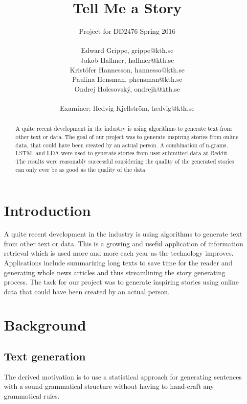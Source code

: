 \documentclass[12pt,a4paper,utf8]{article}
\title{Tell Me a Story}
\author{Project for DD2476 Spring 2016\\\\Edward Grippe, grippe@kth.se\\Jakob Hallmer, hallmer@kth.se\\Kristófer Hannesson, hannesso@kth.se\\Paulina Hensman, phensman@kth.se\\Ondrej Holesovský, ondrejh@kth.se\\\\ Examiner: Hedvig Kjellström, hedvig@kth.se}
\begin{document}
\maketitle
\thispagestyle{empty}
\clearpage


\begin{abstract}
A quite recent development in the industry is using algorithms to generate text from other text or data. The goal of our project was to generate inspiring stories from online data, that could have been created by an actual person. A combination of n-grams, LSTM, and LDA were used to generate stories from user submitted data at Reddit. The results were reasonably successful considering the quality of the generated stories can only ever be as good as the quality of the data.
\end{abstract}
\pagebreak


\pagestyle{plain}
\tableofcontents
\cleardoublepage
\pagebreak




\setcounter{page}{1}
\setcounter{secnumdepth}{3}

\section{Introduction}
A quite recent development in the industry is using algorithms to generate text from other text or data. This is a growing and useful application of information retrieval which is used more and more each year as the technology improves. Applications include summarizing long texts to save time for the reader and generating whole news articles and thus streamlining the story generating process\autocite{RobotJournalist}.
The task for our project was to generate inspiring stories using online data that could have been created by an actual person.

\section{Background}

\subsection{Text generation}
The derived motivation is to use a statistical approach for generating sentences with a sound grammatical structure without having to hand-craft any grammatical rules.
\end{document}
